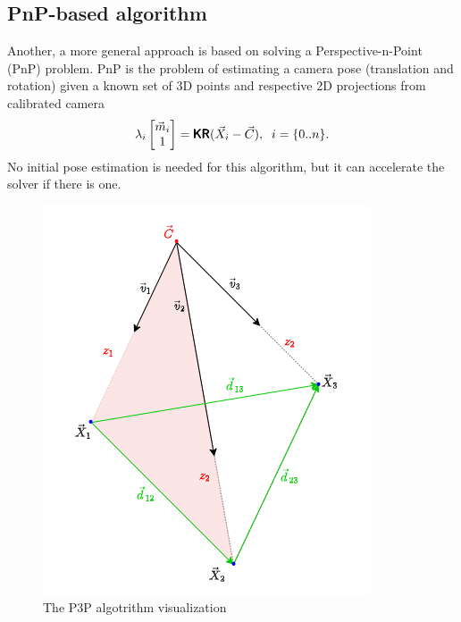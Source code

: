 \subsection{PnP-based algorithm}
\label{sec:pnp}
Another, a more general approach is based on solving a Perspective-n-Point (PnP) problem.
PnP is the problem of estimating a camera pose (translation and rotation) given a known set of 3D points and respective 2D projections from calibrated camera
\begin{equation}
    \lambda_i \begin{bmatrix} \vec{m}_i \\ 1 \end{bmatrix} = \pmb{\mathsf{K}} \pmb{\mathsf{R}} (\vec{X}_i - \vec{C}), \;\; i = \{0..n\}.
\end{equation}
No initial pose estimation is needed for this algorithm, but it can accelerate the solver if there is one.

\begin{figure}[h]
    \centering
    \includegraphics[width=.3\textwidth]{graphics/p3p.png}
    \caption{The P3P algotrithm visualization}
    \label{fig:p3p}
\end{figure}


